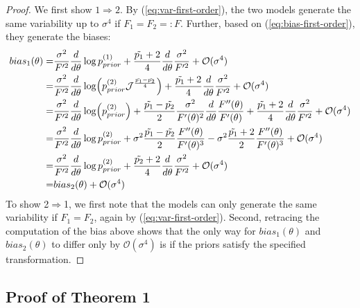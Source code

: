\begin{proof}
    We first show $1 \Rightarrow 2$.
    By (\ref{eq:var-first-order}), the two models generate the same variability up to $\sigma^4$ if $F_1 = F_2 =: F$.
    Further, based on (\ref{eq:bias-first-order}), they generate the biases:
    \begin{align*}
bias_1(\theta) = & \frac{\sigma^2}{F'^2} \frac{d}{d\theta} \log p_{prior}^{(1)} + \frac{\tilde{p_1}+2}{4} \frac{d}{d\theta} \frac{\sigma^2}{F'^2}  + \mathcal{O}(\sigma^4) \\
= & \frac{\sigma^2}{F'^2} \frac{d}{d\theta} \log (p_{prior}^{(2)}  \mathcal{J}^{\frac{\tilde{p_1}-\tilde{p_2}}{4}}) + \frac{\tilde{p_1}+2}{4} \frac{d}{d\theta} \frac{\sigma^2}{F'^2}  + \mathcal{O}(\sigma^4) \\
= & \frac{\sigma^2}{F'^2} \frac{d}{d\theta} \log (p_{prior}^{(2)}) +   \frac{\tilde{p_1}-\tilde{p_2}}{2} \frac{\sigma^2}{F'(\theta)^2} \frac{d}{d\theta} \frac{F''(\theta)}{F'(\theta)} + \frac{\tilde{p_1}+2}{4} \frac{d}{d\theta} \frac{\sigma^2}{F'^2}  + \mathcal{O}(\sigma^4) \\
= & \frac{\sigma^2}{F'^2} \frac{d}{d\theta} \log p_{prior}^{(2)}  + \sigma^2 {\frac{\tilde{p_1}-\tilde{p_2}}{2}} \frac{F''(\theta)}{F'(\theta)^3} - \sigma^2 \frac{\tilde{p_1}+2}{2} \frac{F''(\theta)}{F'(\theta)^3}  + \mathcal{O}(\sigma^4) \\
= & \frac{\sigma^2}{F'^2} \frac{d}{d\theta} \log p_{prior}^{(2)} + \frac{\tilde{p_2}+2}{4} \frac{d}{d\theta} \frac{\sigma^2}{F'^2}  + \mathcal{O}(\sigma^4) \\
= & bias_2(\theta) + \mathcal{O}(\sigma^4)
\end{align*}
To show 2$\Rightarrow$1, we first note that the models can only generate the same variability if $F_1=F_2$, again by (\ref{eq:var-first-order}).
Second, retracing the computation of the bias above shows that the only way for $bias_1(\theta)$ and $bias_2(\theta)$ to differ only by $\mathcal{O}(\sigma^4)$ is if the priors satisfy the specified transformation.
\end{proof}



\subsection{Proof of Theorem 1} 


